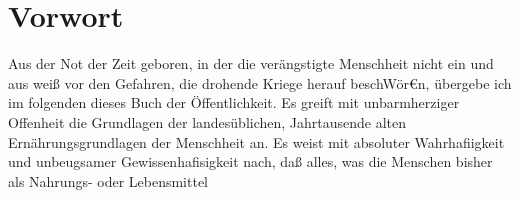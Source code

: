 \chapter*{Vorwort}

Aus der Not der Zeit geboren, in der die verängstigte Menschheit
nicht ein und aus weiß vor den Gefahren, die drohende Kriege herauf
beschWör€n, übergebe ich im folgenden dieses Buch der Öffentlichkeit. Es
greift mit unbarmherziger Offenheit die Grundlagen der landesüblichen,
Jahrtausende alten Ernährungsgrundlagen der Menschheit an. Es weist
mit absoluter Wahrhaﬁigkeit und unbeugsamer Gewissenhaﬁsigkeit nach,
daß alles, was die Menschen bisher als Nahrungs- oder Lebensmittel